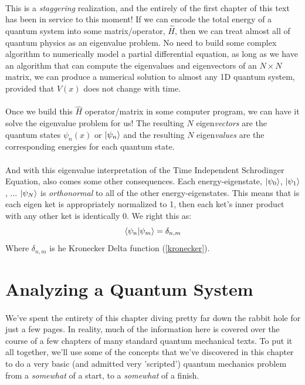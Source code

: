 \documentclass[12pt,letterpaper]{book}
\begin{document}
\paragraph*{}This is a \textit{staggering} realization, and the entirely of the first chapter of this text has been in service to this moment! If we can encode the total energy of a quantum system into some matrix/operator, $\hat{H}$, then we can treat almost all of quantum physics as an eigenvalue problem. No need to build some complex algorithm to numerically model a partial differential equation, as long as we have an algorithm that can compute the eigenvalues and eigenvectors of an $N \times N$ matrix, we can produce a numerical solution to almost any 1D quantum system, provided that $V(x)$ does not change with time.
\paragraph*{}Once we build this $\hat{H}$ operator/matrix in some computer program, we can have it solve the eigenvalue problem for us! The resulting $N$ eigen\textit{vectors} are the quantum states $\psi_n(x)$ or $\ket{\psi_n}$ and the resulting $N$ eigen\textit{values} are the corresponding energies for each quantum state.
\paragraph*{}And with this eigenvalue interpretation of the Time Independent Schrodinger Equation, also comes some other consequences. Each energy-eigenstate, $\ket{\psi_0}$, $\ket{\psi_1}$, ...  $\ket{\psi_N}$ is \textit{orthonormal} to all of the other energy-eigenstates. This means that is each eigen ket is appropriately normalized to 1, then each ket's inner product with any other ket is identically 0. We right this as:
\begin{equation}
\label{orthonorm}
\braket{\psi_n}{\psi_m} = \delta_{n,m}
\end{equation}
Where $\delta_{n,m}$ is he Kronecker Delta function (\ref{kronecker}).


\section{Analyzing a Quantum System}
\paragraph*{}We've spent the entirety of this chapter diving pretty far down the rabbit hole for just a few pages. In reality, much of the information here is covered over the course of a few chapters of many standard quantum mechanical texts. To put it all together, we'll use some of the concepts that we've discovered in this chapter to do a very basic (and admitted very 'scripted') quantum mechanics problem from a \textit{somewhat} of a start, to a \textit{somewhat} of a finish. 
\end{document}
